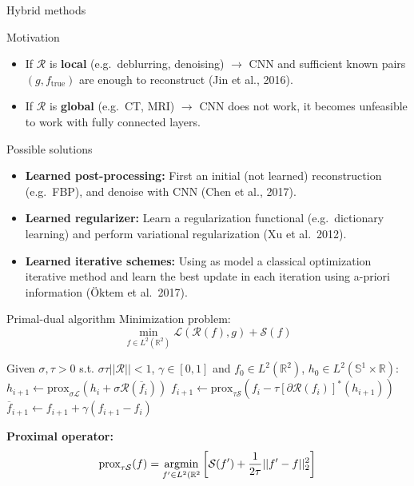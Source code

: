 \begin{frame}{Hybrid methods}

\begin{block}{Motivation}
\begin{itemize}
\item If $\mathcal{R}$ is \textbf{local} (e.g.\ deblurring, denoising) $\longrightarrow$ CNN and sufficient known pairs $(g,f_{\text{true}})$ are enough to reconstruct (Jin et al., 2016).

\item If  $\mathcal{R}$ is \textbf{global} (e.g.\ CT, MRI) $\longrightarrow$ CNN does not work, it becomes unfeasible to work with fully connected layers.
\end{itemize}
\end{block}

\pause

\begin{block}{Possible solutions}
\begin{itemize}
\item \textbf{Learned post-processing:} First an initial (not learned) reconstruction (e.g.\ FBP), and denoise with CNN (Chen et al., 2017).
\item \textbf{Learned regularizer:} Learn a regularization functional (e.g.\ dictionary learning) and perform variational regularization (Xu et al.\, 2012).
\item \textbf{Learned iterative schemes:} Using as model a classical optimization iterative method and learn the best update in each iteration using a-priori information (\"Oktem et al.\, 2017).
\end{itemize}
\end{block}

\end{frame}

\begin{frame}{Primal-dual algorithm}
 Minimization problem:
$$
\min_{f\in L^2(\mathbb{R}^2)} \mathcal{L}(\mathcal{R}(f),g)+\mathcal{S}(f)
$$
\pause
\begin{algorithm}[H]
\begin{algorithmic}[1]
\STATE Given $\sigma, \tau>0$ s.t. $\sigma\tau||\mathcal{R}||<1$, $\gamma\in [0,1]$ and $f_0\in L^2(\mathbb{R}^2)$, $h_0\in L^2(\mathbb{S}^1\times\mathbb{R})$: 
\STATE $h_{i+1}\longleftarrow \text{prox}_{\sigma\mathcal{L}} (h_i+\sigma \mathcal{R}(\overline{f}_i))$
\STATE $f_{i+1}\longleftarrow \text{prox}_{\tau \mathcal{S}}(f_i-\tau[\partial\mathcal{R}(f_i)]^*(h_{i+1}))$
\STATE $\overline{f}_{i+1}\longleftarrow f_{i+1}+\gamma (f_{i+1}-f_i)$
\ENDFOR
\end{algorithmic}
\caption{Non-linear primal-dual algorithm}
\label{alg:seq}
\end{algorithm}
\pause
\textbf{Proximal operator:}
$$
\text{prox}_{\tau \mathcal{S}}(f)=\operatorname*{argmin}_{f'\in L^2(\mathbb{R}^2} \left[ \mathcal{S}(f')+\frac{1}{2\tau}||f'-f||^2_2\right]
$$
\end{frame}

